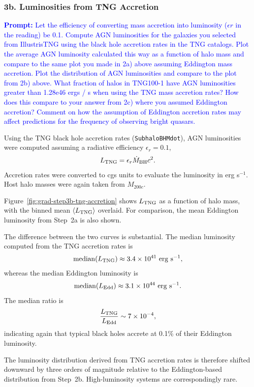 \documentclass[twocolumn]{aastex631}
\begin{document}
\subsubsection{3b. Luminosities from TNG Accretion}
\textcolor{blue}{\textbf{Prompt:} Let the efficiency of converting mass accretion into luminosity ($\epsilon r$ in the reading) be 0.1. Compute AGN luminosities for the galaxies you selected from IllustrisTNG using the black hole accretion rates in the TNG catalogs. Plot the average AGN luminosity calculated this way as a function of halo mass and compare to the same plot you made in 2a) above assuming Eddington mass accretion. Plot the distribution of AGN luminosities and compare to the plot from 2b) above. What fraction of halos in TNG100-1 have AGN luminosities greater than 1.28e46 ergs / s when using the TNG mass accretion rates? How does this compare to your answer from 2c) where you assumed Eddington accretion? Comment on how the assumption of Eddington accretion rates may affect predictions for the frequency of observing bright quasars.}

Using the TNG black hole accretion rates (\texttt{SubhaloBHMdot}), AGN luminosities were computed assuming a radiative efficiency $\epsilon_r = 0.1$,
\begin{equation}
L_{\rm TNG} = \epsilon_r \dot{M}_{\rm BH} c^2.
\end{equation}
Accretion rates were converted to cgs units to evaluate the luminosity in erg s$^{-1}$. Host halo masses were again taken from $M_{200c}$.

Figure~\ref{fig:grad-step3b-tng-accretion} shows $L_{\rm TNG}$ as a function of halo mass, with the binned mean $\langle L_{\rm TNG}\rangle$ overlaid. For comparison, the mean Eddington luminosity from Step~2a is also shown.

The difference between the two curves is substantial. The median luminosity computed from the TNG accretion rates is
\[
\mathrm{median}(L_{\rm TNG}) \approx 3.4 \times 10^{41}\ \mathrm{erg\ s^{-1}},
\]
whereas the median Eddington luminosity is
\[
\mathrm{median}(L_{\rm Edd}) \approx 3.1 \times 10^{44}\ \mathrm{erg\ s^{-1}}.
\]
The median ratio is
\[
\frac{L_{\rm TNG}}{L_{\rm Edd}} \sim 7 \times 10^{-4},
\]
indicating again that typical black holes accrete at  0.1\% of their Eddington luminosity.

The luminosity distribution derived from TNG accretion rates is therefore shifted downward by three orders of magnitude relative to the Eddington-based distribution from Step~2b. High-luminosity systems are correspondingly rare. 
\end{document}
